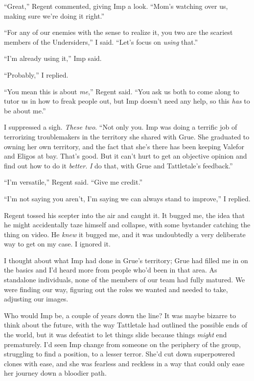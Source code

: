 ``Great,'' Regent commented, giving Imp a look.  ``Mom's watching over us, making sure we're doing it right.''



``For any of our enemies with the sense to realize it, you two are the scariest members of the Undersiders,'' I said.  ``Let's focus on \emph{using} that.''



``I'm already using it,'' Imp said.



``Probably,'' I replied.



``You mean this is about \emph{me},'' Regent said.  ``You ask us both to come along to tutor us in how to freak people out, but Imp doesn't need any help, so this \emph{has} to be about me.''



I suppressed a sigh.  \emph{These two}.  ``Not only you.  Imp was doing a terrific job of terrorizing troublemakers in the territory she shared with Grue.  She graduated to owning her own territory, and the fact that she's there has been keeping Valefor and Eligos at bay.  That's good.  But it can't hurt to get an objective opinion and find out how to do it \emph{better}.  \emph{I} do that, with Grue and Tattletale's feedback.''



``I'm versatile,'' Regent said.  ``Give me credit.''



``I'm not saying you aren't, I'm saying we can always stand to improve,'' I replied.



Regent tossed his scepter into the air and caught it.  It bugged me, the idea that he might accidentally taze himself and collapse, with some bystander catching the thing on video.  He \emph{knew} it bugged me, and it was undoubtedly a very deliberate way to get on my case.  I ignored it.



I thought about what Imp had done in Grue's territory; Grue had filled me in on the basics and I'd heard more from people who'd been in that area.  As standalone individuals, none of the members of our team had fully matured.  We were finding our way, figuring out the roles we wanted and needed to take, adjusting our images.



Who would Imp be, a couple of years down the line?  It was maybe bizarre to think about the future, with the way Tattletale had outlined the possible ends of the world, but it was defeatist to let things slide because things \emph{might} end prematurely.  I'd seen Imp change from someone on the periphery of the group, struggling to find a position, to a lesser terror.  She'd cut down superpowered clones with ease, and she was fearless and reckless in a way that could only ease her journey down a bloodier path.



